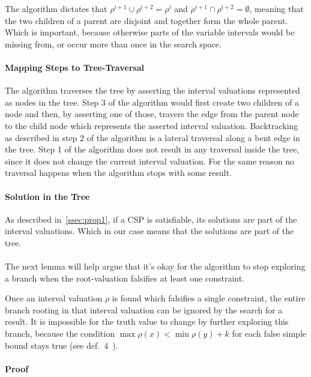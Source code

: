 The algorithm dictates that $\rho^{i+1} \cup \rho^{i+2} = \rho^i$ and $\rho^{i+1} \cap \rho^{i+2} = \emptyset$, meaning that the two children of a parent are disjoint and together form the whole parent.
Which is important, because otherwise parts of the variable intervals would be missing from, or occur more than once in the search space.

\paragraph{Mapping Steps to Tree-Traversal}
The algorithm traverses the tree by asserting the interval valuations represented as nodes in the tree.
Step 3 of the algorithm would first create two children of a node and then, by asserting one of those, travers the edge from the parent node to the child node which represents the asserted interval valuation.
Backtracking as described in step 2 of the algorithm is a lateral traversal along a bent edge in the tree.
Step 1 of the algorithm does not result in any traversal inside the tree, since it does not change the current interval valuation.
For the same reason no traversal happens when the algorithm stops with some result.

\paragraph{Solution in the Tree}
As described in~\ref{ssec:prop1}, if a CSP is satisfiable, its solutions are part of the interval valuations.
Which in our case means that the solutions are part of the tree.

\paragraph{}
The next lemma will help argue that it's okay for the algorithm to stop exploring a branch when the root-valuation falsifies at least one constraint.

\begin{lemma}\label{lemma:false-branches}
    Once an interval valuation $\rho$ is found which falsifies a single constraint, the entire branch rooting in that interval valuation can be ignored by the search for a result.
    It is impossible for the truth value to change by further exploring this branch, because the condition $\max \rho(x) < \min \rho(y) + k$ for each false simple bound stays true (see def.~4~\cite{MF19}). 
\end{lemma}

\paragraph{Proof}

